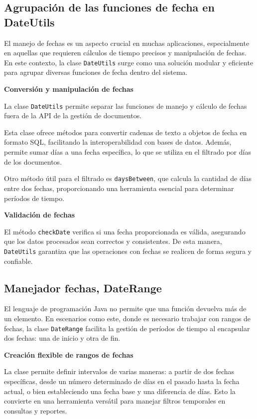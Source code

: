 \documentclass[draft]{scrbook}
\begin{document}
\subsection{ Agrupaci\'on de las funciones de fecha en DateUtils }
\label{subsec:date-utils}

El manejo de fechas es un aspecto crucial en muchas aplicaciones, especialmente en aquellas que requieren cálculos de tiempo precisos y manipulación de fechas. En este contexto, la clase \texttt{DateUtils} surge como una solución modular y eficiente para agrupar diversas funciones de fecha dentro del sistema.

\textbf{Conversión y manipulación de fechas}

La clase \texttt{DateUtils} permite separar las funciones de manejo y cálculo de fechas fuera de la API de la gestión de documentos. 

Esta clase ofrece métodos para convertir cadenas de texto a objetos de fecha en formato SQL, facilitando la interoperabilidad con bases de datos. Además, permite sumar días a una fecha específica, lo que se utiliza en el filtrado por días de los documentos.

Otro método útil para el filtrado es \texttt{daysBetween}, que calcula la cantidad de días entre dos fechas, proporcionando una herramienta esencial para determinar períodos de tiempo.

\textbf{Validación de fechas}

El método \texttt{checkDate} verifica si una fecha proporcionada es válida, asegurando que los datos procesados sean correctos y consistentes. De esta manera, \texttt{DateUtils} garantiza que las operaciones con fechas se realicen de forma segura y confiable.

\subsection{ Manejador fechas, DateRange }
\label{subsec:date-range}

El lenguaje de programación Java no permite que una función devuelva más de un elemento. En escenarios como este, donde es necesario trabajar con rangos de fechas, la clase \texttt{DateRange} facilita la gestión de períodos de tiempo al encapsular dos fechas: una de inicio y otra de fin.

\textbf{Creación flexible de rangos de fechas}

La clase permite definir intervalos de varias maneras: a partir de dos fechas específicas, desde un número determinado de días en el pasado hasta la fecha actual, o bien estableciendo una fecha base y una diferencia de días. Esto la convierte en una herramienta versátil para manejar filtros temporales en consultas y reportes.
\end{document}
